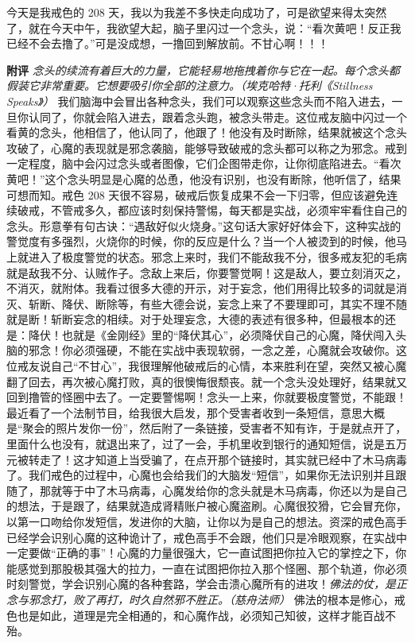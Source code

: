 \begin{case}
    今天是我戒色的 208 天，我以为我差不多快走向成功了，可是欲望来得太突然了，就在今天中午，我欲望大起，脑子里闪过一个念头，说：“看次黄吧！反正我已经不会去撸了。”可是没成想，一撸回到解放前。不甘心啊！！！

    \textbf{附评} \textit{念头的续流有着巨大的力量，它能轻易地拖拽着你与它在一起。每个念头都假装它非常重要。它想要吸引你全部的注意力。（埃克哈特·托利《Stillness Speaks》）} 我们脑海中会冒出各种念头，我们可以观察这些念头而不陷入进去，一旦你认同了，你就会陷入进去，跟着念头跑，被念头带走。这位戒友脑中闪过一个看黄的念头，他相信了，他认同了，他跟了！他没有及时断除，结果就被这个念头攻破了，心魔的表现就是邪念袭脑，能够导致破戒的念头都可以称之为邪念。戒到一定程度，脑中会闪过念头或者图像，它们企图带走你，让你彻底陷进去。“看次黄吧！”这个念头明显是心魔的怂恿，他没有识别，也没有断除，他听信了，结果可想而知。戒色 208 天很不容易，破戒后恢复成果不会一下归零，但应该避免连续破戒，不管戒多久，都应该时刻保持警惕，每天都是实战，必须牢牢看住自己的念头。形意拳有句古诀：“遇敌好似火烧身。”这句话大家好好体会下，这种实战的警觉度有多强烈，火烧你的时候，你的反应是什么？当一个人被烫到的时候，他马上就进入了极度警觉的状态。邪念上来时，我们不能敌我不分，很多戒友犯的毛病就是敌我不分、认贼作子。念敌上来后，你要警觉啊！这是敌人，要立刻消灭之，不消灭，就附体。我看过很多大德的开示，对于妄念，他们用得比较多的词就是消灭、斩断、降伏、断除等，有些大德会说，妄念上来了不要理即可，其实不理不随就是断！斩断妄念的相续。对于处理妄念，大德的表述有很多种，但最根本的还是：降伏！也就是《金刚经》里的“降伏其心”，必须降伏自己的心魔，降伏闯入头脑的邪念！你必须强硬，不能在实战中表现软弱，一念之差，心魔就会攻破你。这位戒友说自己“不甘心”，我很理解他破戒后的心情，本来胜利在望，突然又被心魔翻了回去，再次被心魔打败，真的很懊悔很颓丧。就一个念头没处理好，结果就又回到撸管的怪圈中去了。一定要警惕啊！念头一上来，你就要极度警觉，不能跟！最近看了一个法制节目，给我很大启发，那个受害者收到一条短信，意思大概是“聚会的照片发你一份”，然后附了一条链接，受害者不知有诈，于是就点开了，里面什么也没有，就退出来了，过了一会，手机里收到银行的通知短信，说是五万元被转走了！这才知道上当受骗了，在点开那个链接时，其实就已经中了木马病毒了。我们戒色的过程中，心魔也会给我们的大脑发“短信”，如果你无法识别并且跟随了，那就等于中了木马病毒，心魔发给你的念头就是木马病毒，你还以为是自己的想法，于是跟了，结果就造成肾精账户被心魔盗刷。心魔很狡猾，它会冒充你，以第一口吻给你发短信，发进你的大脑，让你以为是自己的想法。资深的戒色高手已经学会识别心魔的这种诡计了，戒色高手不会跟，他们只是冷眼观察，在实战中一定要做“正确的事”！心魔的力量很强大，它一直试图把你拉入它的掌控之下，你能感觉到那股极其强大的拉力，一直在试图把你拉入那个怪圈、那个轨道，你必须时刻警觉，学会识别心魔的各种套路，学会击溃心魔所有的进攻！\textit{佛法的仗，是正念与邪念打，败了再打，时久自然邪不胜正。（慈舟法师）} 佛法的根本是修心，戒色也是如此，道理是完全相通的，和心魔作战，必须知己知彼，这样才能百战不殆。
\end{case}

